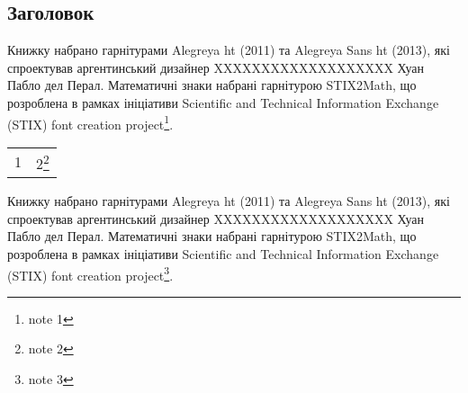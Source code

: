 \documentclass{kapital}
\begin{document}
\subsection[Заголовок]{Заголовок\footnotemark{}}

Книжку набрано гарнітурами Alegreya ht (2011) та Alegreya Sans ht (2013), які спроектував аргентинський дизайнер XXXXXXXXXXXXXXXXXXX Хуан Пабло дел Перал. Математичні знаки набрані гарнітурою STIX2Math, що розроблена в рамках ініціативи Scientific and Technical Information Exchange (STIX) font creation project\footnote{note 1}. 

\begin{tabularx}{10em}{Xl}
1 & 2\footnote{note 2}
\end{tabularx}

Книжку набрано гарнітурами Alegreya ht (2011) та Alegreya Sans ht (2013), які спроектував аргентинський дизайнер XXXXXXXXXXXXXXXXXXX Хуан Пабло дел Перал. Математичні знаки набрані гарнітурою STIX2Math, що розроблена в рамках ініціативи Scientific and Technical Information Exchange (STIX) font creation project\footnote{note 3}. 
\end{document}

